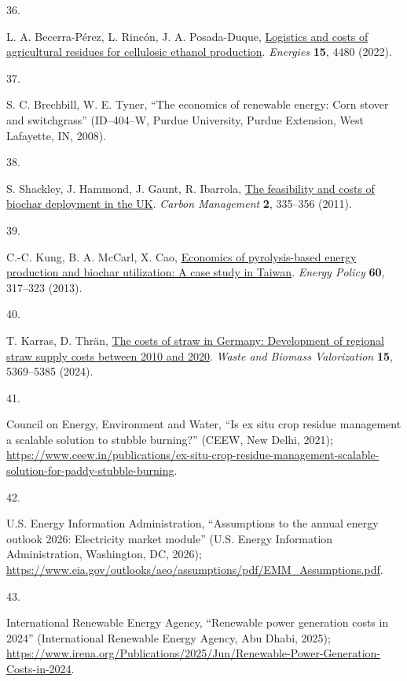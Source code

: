 \documentclass[
  letterpaper,
]{article}
\newlength{\cslhangindent}
\newlength{\csllabelwidth}
\newenvironment{CSLReferences}[2] %
 {\begin{list}{}{%
  \setlength{\itemindent}{0pt}
  \setlength{\leftmargin}{0pt}
  \setlength{\parsep}{0pt}
  \ifodd #1
   \setlength{\leftmargin}{\cslhangindent}
   \setlength{\itemindent}{-1\cslhangindent}
  \fi
  \setlength{\itemsep}{#2\baselineskip}}}
 {\end{list}}
\newcommand{\CSLLeftMargin}[1]{\parbox[t]{\csllabelwidth}{\strut#1\strut}}
\newcommand{\CSLRightInline}[1]{\parbox[t]{\linewidth - \csllabelwidth}{\strut#1\strut}}
\begin{document}
\begin{CSLReferences}{0}{1}
\CSLLeftMargin{36. }%
\CSLRightInline{L. A. Becerra-Pérez, L. Rincón, J. A. Posada-Duque,
\href{https://doi.org/10.3390/en15124480}{Logistics and costs of
agricultural residues for cellulosic ethanol production}.
\emph{Energies} \textbf{15}, 4480 (2022).}

\CSLLeftMargin{37. }%
\CSLRightInline{S. C. Brechbill, W. E. Tyner, {``The economics of
renewable energy: Corn stover and switchgrass''} (ID--404--W, Purdue
University, Purdue Extension, West Lafayette, IN, 2008).}

\CSLLeftMargin{38. }%
\CSLRightInline{S. Shackley, J. Hammond, J. Gaunt, R. Ibarrola,
\href{https://doi.org/10.4155/cmt.11.22}{The feasibility and costs of
biochar deployment in the {UK}}. \emph{Carbon Management} \textbf{2},
335--356 (2011).}

\CSLLeftMargin{39. }%
\CSLRightInline{C.-C. Kung, B. A. McCarl, X. Cao,
\href{https://doi.org/10.1016/j.enpol.2013.05.029}{Economics of
pyrolysis-based energy production and biochar utilization: A case study
in {Taiwan}}. \emph{Energy Policy} \textbf{60}, 317--323 (2013).}

\CSLLeftMargin{40. }%
\CSLRightInline{T. Karras, D. Thrän,
\href{https://doi.org/10.1007/s12649-024-02528-x}{The costs of straw in
{Germany}: Development of regional straw supply costs between 2010 and
2020}. \emph{Waste and Biomass Valorization} \textbf{15}, 5369--5385
(2024).}

\CSLLeftMargin{41. }%
\CSLRightInline{Council on Energy, Environment and Water, {``Is ex situ
crop residue management a scalable solution to stubble burning?''}
(CEEW, New Delhi, 2021);
\url{https://www.ceew.in/publications/ex-situ-crop-residue-management-scalable-solution-for-paddy-stubble-burning}.}

\CSLLeftMargin{42. }%
\CSLRightInline{U.S. Energy Information Administration, {``Assumptions
to the annual energy outlook 2026: Electricity market module''} (U.S.
Energy Information Administration, Washington, DC, 2026);
\url{https://www.eia.gov/outlooks/aeo/assumptions/pdf/EMM_Assumptions.pdf}.}

\CSLLeftMargin{43. }%
\CSLRightInline{International Renewable Energy Agency, {``Renewable
power generation costs in 2024''} (International Renewable Energy
Agency, Abu Dhabi, 2025);
\url{https://www.irena.org/Publications/2025/Jun/Renewable-Power-Generation-Costs-in-2024}.}


\end{CSLReferences}
\end{document}
